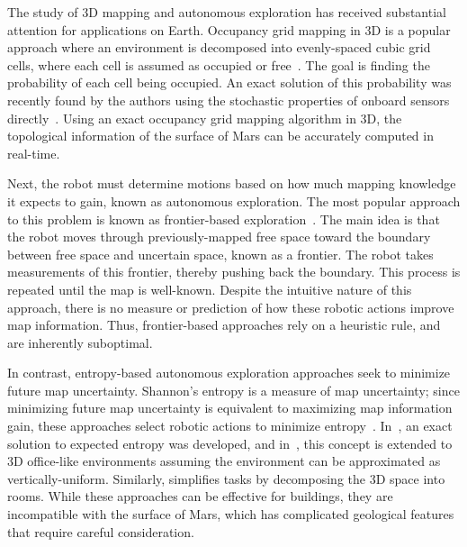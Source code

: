 \documentclass[conf]{new-aiaa}
\begin{document}
The study of 3D mapping and autonomous exploration has received substantial attention for applications on Earth. Occupancy grid mapping in 3D is a popular approach where an environment is decomposed into evenly-spaced cubic grid cells, where each cell is assumed as occupied or free~\cite{ThrBurFox05,WurHorBenStaBur10}. The goal is finding the probability of each cell being occupied. An exact solution of this probability was recently found by the authors using the stochastic properties of onboard sensors directly~\cite{KauLeeAiMos16,KauTakAiLee17}. Using an exact occupancy grid mapping algorithm in 3D, the topological information of the surface of Mars can be accurately computed in real-time.

Next, the robot must determine motions based on how much mapping knowledge it expects to gain, known as autonomous exploration. The most popular approach to this problem is known as frontier-based exploration~\cite{ZhuDinLinWu15,SenWan16,KleDor13}. The main idea is that the robot moves through previously-mapped free space toward the boundary between free space and uncertain space, known as a frontier. The robot takes measurements of this frontier, thereby pushing back the boundary. This process is repeated until the map is well-known. Despite the intuitive nature of this approach, there is no measure or prediction of how these robotic actions improve map information. Thus, frontier-based approaches rely on a heuristic rule, and are inherently suboptimal.

In contrast, entropy-based autonomous exploration approaches seek to minimize future map uncertainty. Shannon's entropy is a measure of map uncertainty; since minimizing future map uncertainty is equivalent to maximizing map information gain, these approaches select robotic actions to minimize entropy~\cite{StaGriBur05}. In~\cite{KauAiLee16}, an exact solution to expected entropy was developed, and in~\cite{KauTakAiLee18}, this concept is extended to 3D office-like environments assuming the environment can be approximated as vertically-uniform. Similarly, \cite{MauDakPet14} simplifies tasks by decomposing the 3D space into rooms. While these approaches can be effective for buildings, they are incompatible with the surface of Mars, which has complicated geological features that require careful consideration.
\end{document}
